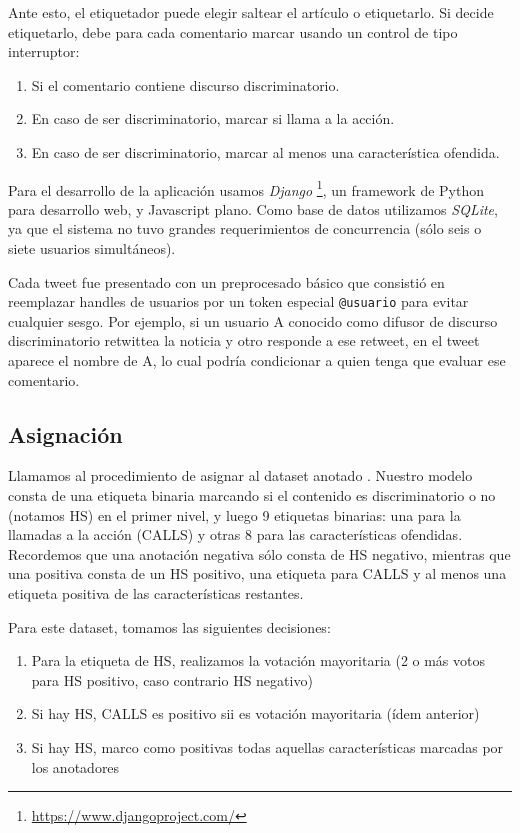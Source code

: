 Ante esto, el etiquetador puede elegir saltear el artículo o etiquetarlo. Si decide etiquetarlo, debe para cada comentario marcar usando un control de tipo interruptor:

\begin{enumerate}
    \item Si el comentario contiene discurso discriminatorio.
    \item En caso de ser discriminatorio, marcar si llama a la acción.
    \item En caso de ser discriminatorio, marcar al menos una característica ofendida.
\end{enumerate}

Para el desarrollo de la aplicación usamos \emph{Django} \footnote{\url{https://www.djangoproject.com/}}, un framework de Python para desarrollo web, y Javascript plano. Como base de datos utilizamos \emph{SQLite}, ya que el sistema no tuvo grandes requerimientos de concurrencia (sólo seis o siete usuarios simultáneos).


Cada tweet fue presentado con un preprocesado básico que consistió en reemplazar handles de usuarios por un token especial \verb|@usuario| para evitar cualquier sesgo. Por ejemplo, si un usuario A conocido como difusor de discurso discriminatorio retwittea la noticia y otro responde a ese retweet, en el tweet aparece el nombre de A, lo cual podría condicionar a quien tenga que evaluar ese comentario.


\subsection{Asignación}

Llamamos  al procedimiento de asignar  al dataset anotado \cite{pustejovsky2012natural}. Nuestro modelo consta de una etiqueta binaria marcando si el contenido es discriminatorio o no (notamos HS) en el primer nivel, y luego 9 etiquetas binarias: una para la llamadas a la acción (CALLS) y otras 8 para las características ofendidas. Recordemos que una anotación negativa sólo consta de HS negativo, mientras que una positiva consta de un HS positivo, una etiqueta para CALLS y al menos una etiqueta positiva de las características restantes.

Para este dataset, tomamos las siguientes decisiones:

\begin{enumerate}
    \item Para la etiqueta de HS, realizamos la votación mayoritaria (2 o más votos para HS positivo, caso contrario HS negativo)
    \item Si hay HS, CALLS es positivo sii es votación mayoritaria (ídem anterior)
    \item Si hay HS, marco como positivas todas aquellas características marcadas por los anotadores
\end{enumerate}

